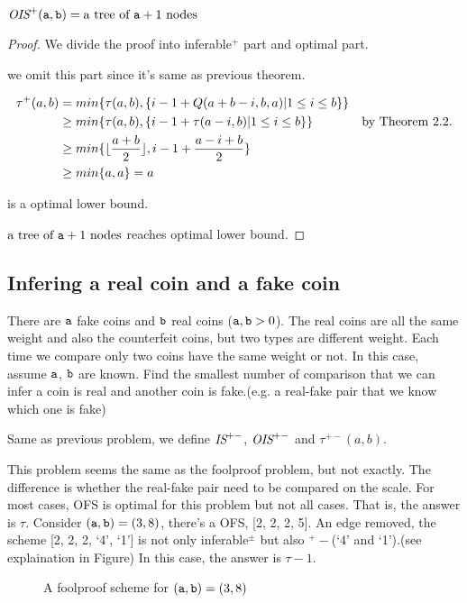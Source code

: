\begin{theorem}
$\text{\it OIS}^+(\mathtt{a},\mathtt{b})=\text{a tree of }\mathtt{a}+1\text{ nodes}$
\end{theorem}
\begin{proof}
We divide the proof into inferable$^+$ part and optimal part.


we omit this part since it's same as previous theorem.

\begin{align*}
\tau^+(a,b)&=min\{\tau(a,b), \{i-1+Q(a+b-i,b,a) | 1\leq i\leq b\} \}&\\
&\geq min\{\tau(a,b), \{i-1+\tau(a-i,b) | 1\leq i\leq b\} \} &\text{by Theorem 2.2.}\\
&\geq min\{\lfloor\frac{a+b}{2}\rfloor, i-1+\frac{a-i+b}{2}\}&\\
&\geq min\{a, a\}=a &
\end{align*}

is a optimal lower bound.

$\text{a tree of }\mathtt{a}+1\text{ nodes}$ reaches optimal lower bound.
\end{proof}

\subsection*{Infering a real coin and a fake coin}

{
\setlength{\leftskip}{1cm}
\setlength{\rightskip}{1cm}
\noindent 
There are $\mathtt{a}$ fake coins and $\mathtt{b}$ real coins ($\mathtt{a}, \mathtt{b} > 0$). The real coins are all the same weight and also the counterfeit coins, but two  types are different weight. Each time we compare only two coins have the same weight or not. In this case, assume $\mathtt{a}$, $\mathtt{b}$ are known.
Find the smallest number of comparison that we can infer a coin is real and another coin is fake.(e.g. a real-fake pair that we know which one is fake)\\

}
\begin{definition}
Same as previous problem, we define $\text{\it IS}^{+-}$, $\text{\it OIS}^{+-}$ and $\tau^{+-}(a,b)$.
\end{definition}

This problem seems the same as the foolproof problem, but not exactly. The difference is whether the real-fake pair need to be compared on the scale. For most cases, OFS is optimal for this problem but not all cases. That is, the answer is $\tau$. Consider $(\mathtt{a},\mathtt{b})=(3,8)$, there's a OFS, [2, 2, 2, 5]. An edge removed, the scheme [2, 2, 2, `4', `1'] is not only inferable$^\pm$ but also $^+-$(`4' and `1').(see explaination in Figure) In this case, the answer is $\tau-1$.
\begin{figure}[!htb]
   \centering
     \vspace*{2.5ex}
    \caption{A foolproof scheme for $(\mathtt{a},\mathtt{b})=(3,8)$}
\end{figure}


